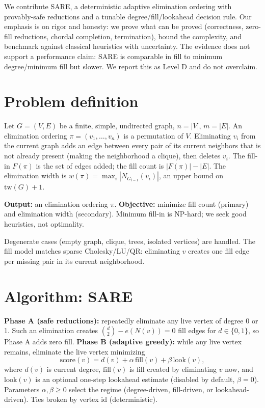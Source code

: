 \documentclass[11pt]{article}
\theoremstyle{plain}
\theoremstyle{definition}
\begin{document}
We contribute SARE, a deterministic adaptive elimination ordering with provably-safe
reductions and a tunable degree/fill/lookahead decision rule. Our emphasis is on rigor and
honesty: we prove what can be proved (correctness, zero-fill reductions, chordal
completion, termination), bound the complexity, and benchmark against classical heuristics
with uncertainty. The evidence does not support a performance claim: SARE is comparable in
fill to minimum degree/minimum fill but slower. We report this as Level D and do not
overclaim.

\section{Problem definition}
Let $G=(V,E)$ be a finite, simple, undirected graph, $n=|V|$, $m=|E|$. An elimination
ordering $\pi=(v_1,\dots,v_n)$ is a permutation of $V$. Eliminating $v_i$ from the current
graph adds an edge between every pair of its current neighbors that is not already present
(making the neighborhood a clique), then deletes $v_i$. The fill-in $F(\pi)$ is the set of
edges added; the fill count is $|F(\pi)|-|E|$. The elimination width is
$w(\pi)=\max_i |N_{G_{i-1}}(v_i)|$, an upper bound on $\mathrm{tw}(G)+1$.

\textbf{Output:} an elimination ordering $\pi$. \textbf{Objective:} minimize fill count
(primary) and elimination width (secondary). Minimum fill-in is NP-hard; we seek good
heuristics, not optimality.

Degenerate cases (empty graph, clique, trees, isolated vertices) are handled. The fill
model matches sparse Cholesky/LU/QR: eliminating $v$ creates one fill edge per missing pair
in its current neighborhood.

\section{Algorithm: SARE}
\textbf{Phase A (safe reductions):} repeatedly eliminate any live vertex of degree 0 or 1.
Such an elimination creates $\binom{d}{2}-e(N(v))=0$ fill edges for $d\in\{0,1\}$, so Phase
A adds zero fill. \textbf{Phase B (adaptive greedy):} while any live vertex remains,
eliminate the live vertex minimizing
\[
  \mathrm{score}(v) = d(v) + \alpha\,\mathrm{fill}(v) + \beta\,\mathrm{look}(v),
\]
where $d(v)$ is current degree, $\mathrm{fill}(v)$ is fill created by eliminating $v$ now,
and $\mathrm{look}(v)$ is an optional one-step lookahead estimate (disabled by default,
$\beta=0$). Parameters $\alpha,\beta\ge0$ select the regime (degree-driven, fill-driven, or
lookahead-driven). Ties broken by vertex id (deterministic).
\end{document}
